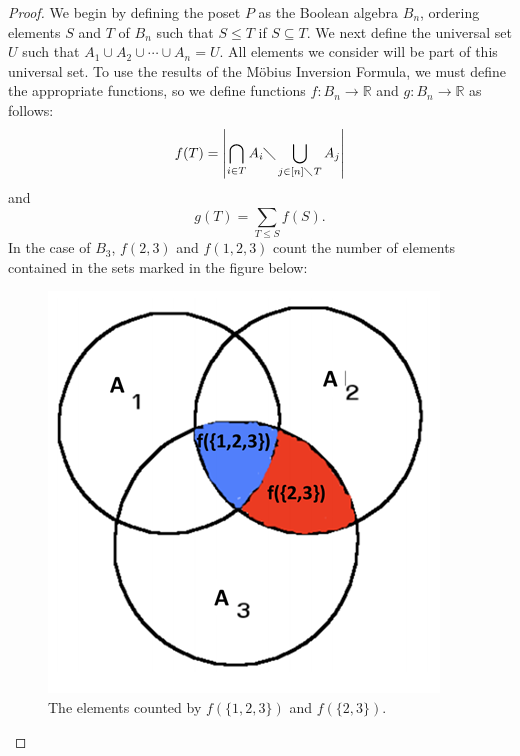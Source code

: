 \documentclass{article} %
\theoremstyle{definition}
\theoremstyle{plain}
\begin{document}
\begin{proof} We begin by defining the poset $P$ as the Boolean algebra $B_n$, ordering elements $S$ and $T$ of $B_n$ such that $S\leq T$ if $S\subseteq T$. We next define the universal set $U$ such that $A_1\cup A_2 \cup \cdots \cup A_n=U$. All elements we consider will be part of this universal set. To use the results of the M\"{o}bius Inversion Formula, we must define the appropriate functions, so we define functions $f:B_n\rightarrow \mathbb{R}$ and $g:B_n\rightarrow \mathbb{R}$ as follows:
$$f(T)=\left|\bigcap_{i\in T}A_i\diagdown\bigcup_{j\in [n]\diagdown T}A_j\right|$$
and
$$g(T)=\sum_{T \le S}f(S).$$
In the case of $B_3$, $f({2,3})$ and $f({1,2,3})$ count the number of elements contained in the sets marked in the figure below:

\begin{figure}[h!]
    \centering
        \includegraphics[scale=.75]{Inclusion-Exclusion(small).png}
    \caption{The elements counted by $f(\{1,2,3\})$ and $f(\{2,3\})$.}
\end{figure}


\end{proof}
\end{document}
